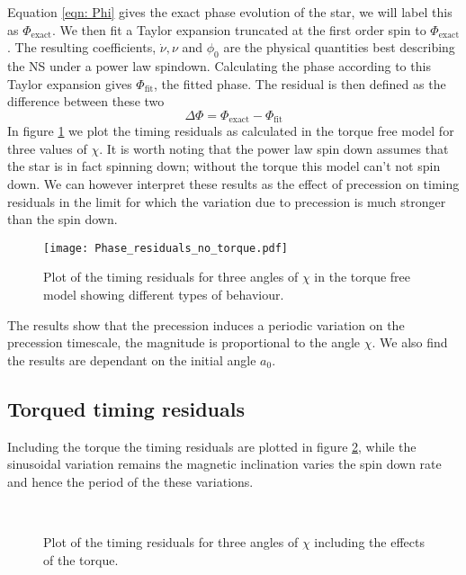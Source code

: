 \documentclass[../full_thesis/full_thesis.tex]{subfiles}
\begin{document}
Equation \eqref{eqn: Phi} gives the exact phase evolution of the star, we will
label this as $\Phi_{\textrm{exact}}$. We then fit a Taylor expansion truncated
at the first order spin to $\Phi_{\textrm{exact}}$. The resulting coefficients,
$\dot{\nu}, \nu$ and $\phi_{0}$ are the physical quantities best describing the
NS under a power law spindown. Calculating the phase according to this Taylor
expansion gives $\Phi_{\textrm{fit}}$, the fitted phase. The residual is then
defined as the difference between these two
\begin{equation}
  \Delta\Phi = \Phi_{\textrm{exact}} - \Phi_{\textrm{fit}}
\end{equation}
In figure \ref{fig: TR no torque} we plot the timing residuals as calculated in
the torque free model for three values of $\chi$. It is worth noting that the
power law spin down assumes that the star is in fact spinning down; without the
torque this model can't not spin down. We can however interpret these results
as the effect of precession on timing residuals in the limit for which the
variation due to precession is much stronger than the spin down.
\begin{figure}[ht]
\centering
	\texttt{[image: Phase\_residuals\_no\_torque.pdf]}
\caption{Plot of the timing residuals for three angles of $\chi$ in the torque
         free model showing different types of behaviour. }
\label{fig: TR no torque}
\end{figure}
The results show that the precession induces a periodic variation on the
precession timescale, the magnitude is proportional to the angle $\chi$. We
also find the results are dependant on the initial angle $a_{0}$.
\subsection{Torqued timing residuals}
Including the torque the timing residuals are plotted in figure \ref{fig: TR with torque}, while the sinusoidal variation remains the magnetic inclination varies the spin down rate and hence the period of the these variations.
\begin{figure}[ht]
\centering
	 \\

\caption{Plot of the timing residuals for three angles of $\chi$ including the effects of the torque. }
\label{fig: TR with torque}
\end{figure}
\end{document}
